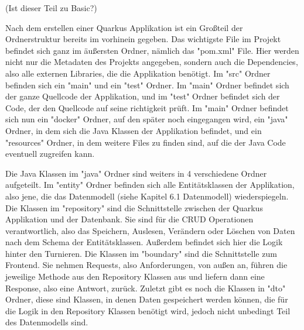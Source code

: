 (Ist dieser Teil zu Basic?)

Nach dem erstellen einer Quarkus Applikation ist ein Großteil der Ordnerstruktur bereits im vorhinein gegeben. Das wichtigste File im Projekt befindet sich ganz im äußersten Ordner, nämlich das "pom.xml" File. Hier werden 
nicht nur die Metadaten des Projekts angegeben, sondern auch die Dependencies, also alle externen Libraries, die die Applikation benötigt. 
Im "src" Ordner befinden sich ein "main" und ein "test" Ordner. Im "main" Ordner befindet sich der ganze Quellcode der Applikation, und im "test" Ordner befindet sich der Code, der den Quellcode auf seine richtigkeit prüft.
Im "main" Ordner befindet sich nun ein "docker" Ordner, auf den später noch eingegangen wird, ein "java" Ordner, in dem sich die Java Klassen der Applikation befindet, und ein "resources" Ordner, in dem weitere Files zu finden sind, 
auf die der Java Code eventuell zugreifen kann.

Die Java Klassen im "java" Ordner sind weiters in 4 verschiedene Ordner aufgeteilt. Im "entity" Ordner befinden sich alle Entitätsklassen der Applikation, also jene, die das Datenmodell (siehe Kapitel 6.1 Datenmodell) wiederspiegeln.
Die Klassen im "repository" sind die Schnittstelle zwischen der Quarkus Applikation und der Datenbank. Sie sind für die CRUD Operationen verantwortlich, also das Speichern, Auslesen, Verändern oder Löschen von Daten nach dem Schema der Entitätsklassen.
Außerdem befindet sich hier die Logik hinter den Turnieren. Die Klassen im "boundary" sind die Schnittstelle zum Frontend. Sie nehmen Requests, also Anforderungen, von außen an, 
führen die jeweilige Methode aus den Repository Klassen aus und liefern dann eine Response, also eine Antwort, zurück. Zuletzt gibt es noch die Klassen in "dto" Ordner, diese sind Klassen, in denen Daten gespeichert werden können, die für die Logik in den 
Repository Klassen benötigt wird, jedoch nicht unbedingt Teil des Datenmodells sind.
 